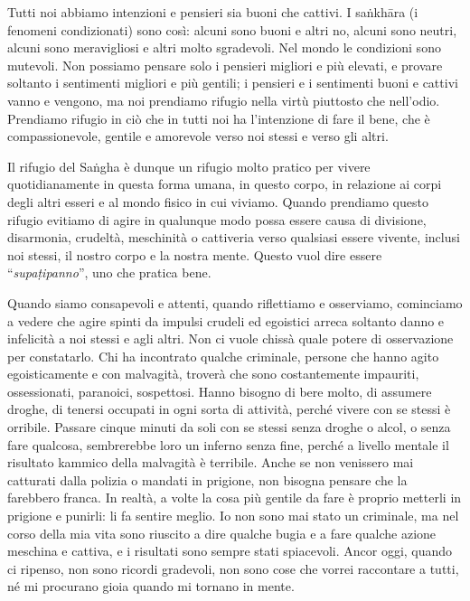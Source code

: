Tutti noi abbiamo intenzioni e pensieri sia buoni che cattivi. I
saṅkhāra (i fenomeni condizionati) sono così: alcuni sono buoni e altri
no, alcuni sono neutri, alcuni sono meravigliosi e altri molto
sgradevoli. Nel mondo le condizioni sono mutevoli. Non possiamo pensare
solo i pensieri migliori e più elevati, e provare soltanto i sentimenti
migliori e più gentili; i pensieri e i sentimenti buoni e cattivi vanno
e vengono, ma noi prendiamo rifugio nella virtù piuttosto che nell'odio.
Prendiamo rifugio in ciò che in tutti noi ha l'intenzione di fare il
bene, che è compassionevole, gentile e amorevole verso noi stessi e
verso gli altri.

Il rifugio del Saṅgha è dunque un rifugio molto pratico per vivere
quotidianamente in questa forma umana, in questo corpo, in relazione ai
corpi degli altri esseri e al mondo fisico in cui viviamo. Quando
prendiamo questo rifugio evitiamo di agire in qualunque modo possa
essere causa di divisione, disarmonia, crudeltà, meschinità o cattiveria
verso qualsiasi essere vivente, inclusi noi stessi, il nostro corpo e la
nostra mente. Questo vuol dire essere ``\emph{supaṭipanno}'', uno che
pratica bene.

Quando siamo consapevoli e attenti, quando riflettiamo e osserviamo,
cominciamo a vedere che agire spinti da impulsi crudeli ed egoistici
arreca soltanto danno e infelicità a noi stessi e agli altri. Non ci
vuole chissà quale potere di osservazione per constatarlo. Chi ha
incontrato qualche criminale, persone che hanno agito egoisticamente e
con malvagità, troverà che sono costantemente impauriti, ossessionati,
paranoici, sospettosi. Hanno bisogno di bere molto, di assumere droghe,
di tenersi occupati in ogni sorta di attività, perché vivere con se
stessi è orribile. Passare cinque minuti da soli con se stessi senza
droghe o alcol, o senza fare qualcosa, sembrerebbe loro un inferno senza
fine, perché a livello mentale il risultato kammico della malvagità è
terribile. Anche se non venissero mai catturati dalla polizia o mandati
in prigione, non bisogna pensare che la farebbero franca. In realtà, a
volte la cosa più gentile da fare è proprio metterli in prigione e
punirli: li fa sentire meglio. Io non sono mai stato un criminale, ma
nel corso della mia vita sono riuscito a dire qualche bugia e a fare
qualche azione meschina e cattiva, e i risultati sono sempre stati
spiacevoli. Ancor oggi, quando ci ripenso, non sono ricordi gradevoli,
non sono cose che vorrei raccontare a tutti, né mi procurano gioia
quando mi tornano in mente.

